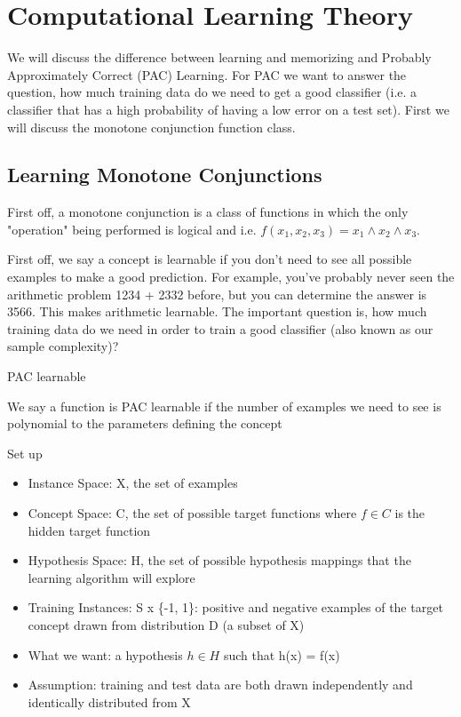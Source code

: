 \chapter{Computational Learning Theory}

We will discuss the difference between learning and memorizing and Probably Approximately Correct (PAC) Learning. For PAC we want to answer the question, how much training data do we need to get a good classifier (i.e. a classifier that has a high probability of having a low error on a test set). First we will discuss the monotone conjunction function class.

\section{Learning Monotone Conjunctions}
First off, a monotone conjunction is a class of functions in which the only "operation" being performed is logical and i.e. $f(x_1, x_2, x_3) = x_1 \land x_2 \land x_3$.

First off, we say a concept is learnable if you don't need to see all possible examples to make a good prediction. For example, you've probably never seen the arithmetic problem 1234 + 2332 before, but you can determine the answer is 3566. This makes arithmetic learnable. The important question is, how much training data do we need in order to train a good classifier (also known as our sample complexity)?

\begin{definition}
    PAC learnable

    We say a function is PAC learnable if the number of examples we need to see is polynomial to the parameters defining the concept
\end{definition}

Set up
\begin{itemize}
    \item Instance Space: X, the set of examples
    \item Concept Space: C, the set of possible target functions where $f \in C$ is the hidden target function
    \item Hypothesis Space: H, the set of possible hypothesis mappings that the learning algorithm will explore
    \item Training Instances: S x \{-1, 1\}: positive and negative examples of the target concept drawn from distribution D (a subset of X)
    \item What we want: a hypothesis $h \in H$ such that h(x) = f(x)
    \item Assumption: training and test data are both drawn independently and identically distributed from X
\end{itemize}

